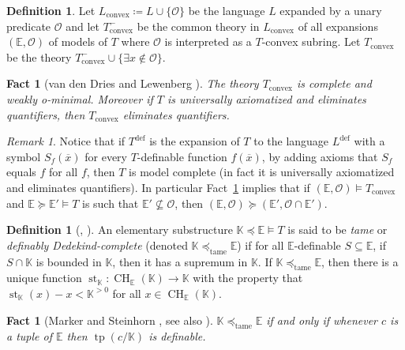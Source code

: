 \documentclass{amsart}
\newtheorem{fact}[theorem]{Fact}
\theoremstyle{remark}
\newtheorem{remark}[theorem]{Remark}
\theoremstyle{definition}
\newtheorem{definition}[theorem]{Definition}
\theoremstyle{plain}
\newcommand{\bE}{\mathbb E}
\newcommand{\bK}{\mathbb K}
\newcommand{\cO}{\mathcal O}
\newcommand{\convex}{\mathrm{convex}}
\newcommand{\tame}{\mathrm{tame}}
\newcommand{\defin}{\mathrm{def}}
\newcommand{\ox}{\overline{x}}
\DeclareMathOperator{\std}{\mathrm{st}}
\DeclareMathOperator{\tp}{\mathrm{tp}}
\DeclareMathOperator{\CH}{\mathrm{CH}}
\theoremstyle{plain}
\begin{document}
\begin{definition}
    Let $L_\convex\coloneqq L \cup \{\cO\}$ be the language $L$ expanded by a unary predicate $\cO$ and let $T_\convex^-$ be the common theory in $L_\convex$ of all expansions $(\bE, \cO)$ of models of $T$ where $\cO$ is interpreted as a $T$-convex subring. Let $T_\convex$ be the theory $T_\convex^- \cup \{\exists x \notin \cO\}$.
\end{definition}

\begin{fact}[{van den Dries and  Lewenberg \cite[3.10 and 3.14]{dries1995t}}]\label{fact:T_convex_is_complete}
    The theory $T_\convex$ is complete and weakly o-minimal. Moreover if $T$ is universally axiomatized and eliminates quantifiers, then $T_\convex$ eliminates quantifiers. 
\end{fact}

\begin{remark}
    Notice that if $T^{\defin}$ is the expansion of $T$ to the language $L^{\defin}$ with a symbol $S_f(\ox)$ for every $T$-definable function $f(\ox)$, by adding axioms that $S_f$ equals $f$ for all $f$, then $T$ is model complete (in fact it is universally axiomatized and eliminates quantifiers). In particular Fact~\ref{fact:T_convex_is_complete} implies that if $(\bE, \cO)\models T_\convex$ and $\bE \succeq \bE'\models T$ is such that $\bE' \not \subseteq \cO$, then $(\bE, \cO) \succeq (\bE', \cO \cap \bE')$.
\end{remark}

\begin{definition}[{\cite[p.187]{marker1994definable}}, {\cite[p.~76 and (1.12)]{dries1997t}}]
    An elementary substructure $\bK \preceq \bE\models T$ is said to be \emph{tame} or \emph{definably Dedekind-complete} (denoted $\bK \preceq_\tame \bE$) if for all $\bE$-definable $S\subseteq \bE$, if $S\cap \bK$ is bounded in $\bK$, then it has a supremum in $\bK$. If $\bK\preceq_\tame \bE$, then there is a unique function $\std_\bK: \CH_\bE(\bK) \to \bK$ with the property that $\std_\bK(x)-x < \bK^{>0}$ for all $x \in \CH_\bE(\bK)$.
\end{definition}

\begin{fact}[{Marker and Steinhorn \cite[Thm.~2.1]{marker1994definable}, see also \cite{andujarguerrero2025marker}
}]
    $\bK \preceq_\tame \bE$ if and only if whenever $c$ is a tuple of $\bE$ then $\tp(c/\bK)$ is definable.
\end{fact}
\end{document}
